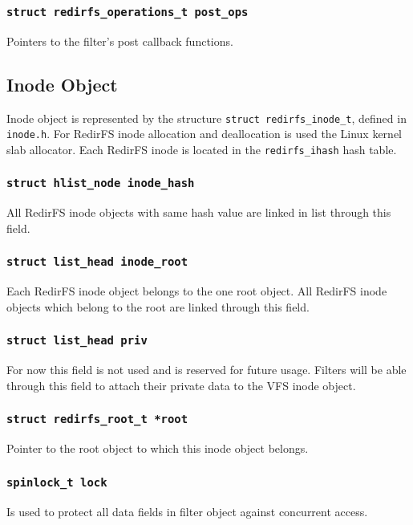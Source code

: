 \subsubsection{\texttt{struct redirfs\_operations\_t post\_ops}}
Pointers to the filter's post callback functions.

\subsection{Inode Object}
Inode object is represented by the structure \texttt{struct redirfs\_inode\_t}, defined in
\texttt{inode.h}. For RedirFS inode allocation and deallocation is used the Linux
kernel slab allocator. Each RedirFS inode is located in the \texttt{redirfs\_ihash} hash
table.

\subsubsection{\texttt{struct hlist\_node inode\_hash}}
All RedirFS inode objects with same hash value are linked in list through this field.

\subsubsection{\texttt{struct list\_head inode\_root}}
Each RedirFS inode object belongs to the one root object. All RedirFS inode objects
which belong to the root are linked through this field.

\subsubsection{\texttt{struct list\_head priv}}
For now this field is not used and is reserved for future usage. Filters will be able
through this field to attach their private data to the VFS inode object.

\subsubsection{\texttt{struct redirfs\_root\_t *root}}
Pointer to the root object to which this inode object belongs.

\subsubsection{\texttt{spinlock\_t lock}}
Is used to protect all data fields in filter object against concurrent access.

